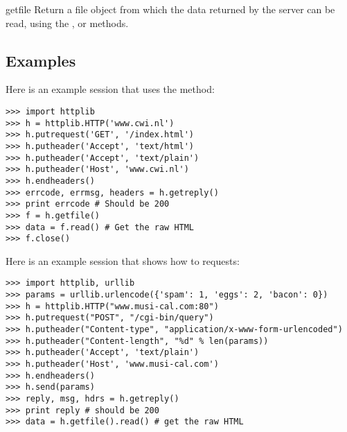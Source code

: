 \begin{methoddesc}{getfile}{}
Return a file object from which the data returned by the server can be
read, using the ,  or
 methods.
\end{methoddesc}


\subsection{Examples \label{httplib-examples}}

Here is an example session that uses the  method:

\begin{verbatim}
>>> import httplib
>>> h = httplib.HTTP('www.cwi.nl')
>>> h.putrequest('GET', '/index.html')
>>> h.putheader('Accept', 'text/html')
>>> h.putheader('Accept', 'text/plain')
>>> h.putheader('Host', 'www.cwi.nl')
>>> h.endheaders()
>>> errcode, errmsg, headers = h.getreply()
>>> print errcode # Should be 200
>>> f = h.getfile()
>>> data = f.read() # Get the raw HTML
>>> f.close()
\end{verbatim}

Here is an example session that shows how to  requests:

\begin{verbatim}
>>> import httplib, urllib
>>> params = urllib.urlencode({'spam': 1, 'eggs': 2, 'bacon': 0})
>>> h = httplib.HTTP("www.musi-cal.com:80")
>>> h.putrequest("POST", "/cgi-bin/query")
>>> h.putheader("Content-type", "application/x-www-form-urlencoded")
>>> h.putheader("Content-length", "%d" % len(params))
>>> h.putheader('Accept', 'text/plain')
>>> h.putheader('Host', 'www.musi-cal.com')
>>> h.endheaders()
>>> h.send(params)
>>> reply, msg, hdrs = h.getreply()
>>> print reply # should be 200
>>> data = h.getfile().read() # get the raw HTML
\end{verbatim}
